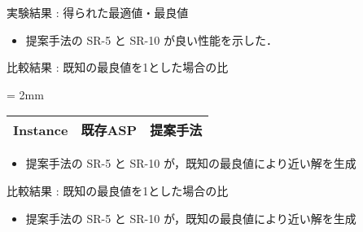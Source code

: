 \documentclass[11pt,dvipdfmx,handout]{beamer}
\begin{document}
\newenvironment{tableB}{%
  \tabcolsep = 2mm
  \renewcommand{\arraystretch}{0.815}						
  \begin{tabular}[t]{c||r|r}\hline
    Instance & 既存ASP & 提案手法 \\\hline
    }{%
    \hline
  \end{tabular}
}
\begin{frame}{実験結果 : 得られた最適値・最良値}

\begin{table}[tbp]\scriptsize
  \label{table:bench:result1}
  \centering
  \begin{tableA}
    
  \end{tableA}
\end{table}
\begin{itemize}
\item 提案手法の SR-5 と SR-10 が良い性能を示した．
\end{itemize}
\end{frame}
\begin{frame}{比較結果 : 既知の最良値を1とした場合の比}
\begin{table}[tbp]\scriptsize
  \label{table:bench:result3}
  \centering
  \begin{tableB}
    
  \end{tableB}
\end{table}
\begin{itemize}
\item 提案手法の SR-5 と SR-10 が，既知の最良値により近い解を生成
\end{itemize}
\end{frame}
\begin{frame}{比較結果 : 既知の最良値を1とした場合の比}
\begin{table}[tbp]\scriptsize
  \label{table:bench:result2}
  \centering
  \begin{tableA}
    
  \end{tableA}
\end{table}
\begin{itemize}
\item 提案手法の SR-5 と SR-10 が，既知の最良値により近い解を生成
\end{itemize}
\end{frame}
\end{document}
